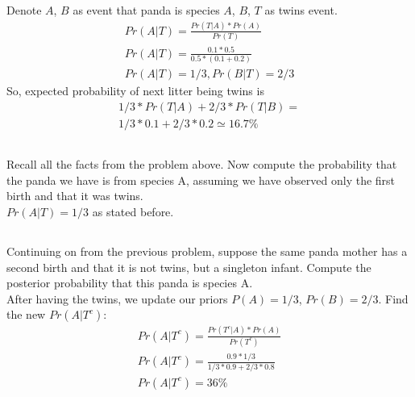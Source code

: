 \documentclass{article}
\begin{document}
Denote $A$, $B$ as event that panda is species $A$, $B$, $T$ as twins event.
\begin{gather}
  Pr(A|T) = \frac{Pr(T|A) * Pr(A)}{Pr(T)} \\
  Pr(A|T) = \frac{0.1 * 0.5}{0.5 * (0.1 + 0.2)} \\
  Pr(A|T) = 1/3, Pr(B|T) = 2/3
\end{gather}
So, expected probability of next litter being twins is
\begin{gather}
  1/3 * Pr(T|A) + 2/3 * Pr(T|B) = \\
  1/3 * 0.1 + 2/3 * 0.2 \simeq 16.7\%
\end{gather}

\subsection{}
Recall all the facts from the problem above. Now compute the probability that
the panda we have is from species A, assuming we have observed only the first
birth and that it was twins. \\

$Pr(A|T) = 1/3$ as stated before.

\subsection{}
Continuing on from the previous problem, suppose the same panda mother has a
second birth and that it is not twins, but a singleton infant. Compute the
posterior probability that this panda is species A. \\

After having the twins, we update our priors $P(A) = 1/3$, $Pr(B) = 2/3$.
Find the new $Pr(A|T^c)$:
\begin{gather}
  Pr(A|T^c) = \frac{Pr(T^c|A) * Pr(A)}{Pr(T^c)} \\
  Pr(A|T^c) = \frac{0.9 * 1/3}{1/3 * 0.9 + 2/3 * 0.8} \\
  Pr(A|T^c) = 36\%
\end{gather}

\end{document}
